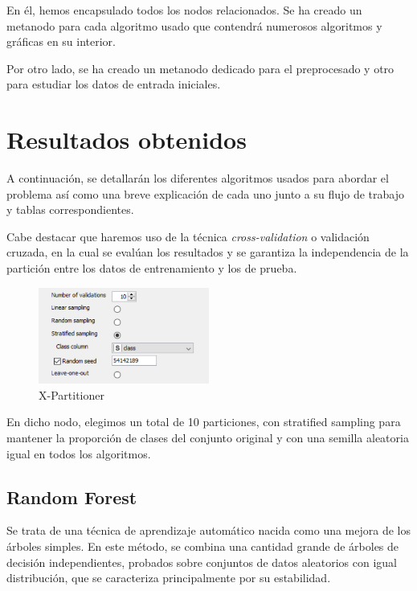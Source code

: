 	En él, hemos encapsulado todos los nodos relacionados. Se ha creado un metanodo para cada algoritmo usado que contendrá numerosos algoritmos y gráficas en su interior.
	
	Por otro lado, se ha creado un metanodo dedicado para el preprocesado y otro para estudiar los datos de entrada iniciales.

	
		
	

	\newpage
	\section{Resultados obtenidos}
	\hspace{1cm} A continuación, se detallarán los diferentes algoritmos usados para abordar el problema así como una breve explicación de cada uno junto a su flujo de trabajo y tablas correspondientes.
	
	Cabe destacar que haremos uso de la técnica \textit{cross-validation} o validación cruzada, en la cual se evalúan los resultados y se garantiza la independencia de la partición entre los datos de entrenamiento y los de prueba.
	
	
	\begin{figure}[H]
		\centering
		\includegraphics[width=0.5\textwidth]{img/Xrandom.png}
		\caption{X-Partitioner}
	\end{figure}
	
	En dicho nodo, elegimos un total de 10 particiones, con stratified sampling para mantener la proporción de clases del conjunto original y con una semilla aleatoria igual en todos los algoritmos. 
	
	
	\subsection{Random Forest}
	\hspace{1cm} Se trata de una técnica de aprendizaje automático nacida como una mejora de los árboles simples. En este método, se combina una cantidad grande de árboles de decisión independientes, probados sobre conjuntos de datos aleatorios con igual distribución, que se caracteriza principalmente por su estabilidad.
	
